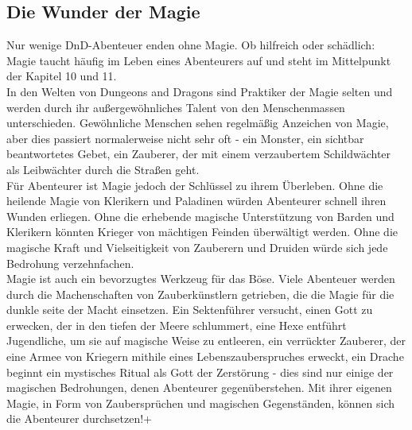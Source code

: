 \subsection{Die Wunder der Magie}
Nur wenige DnD-Abenteuer enden ohne Magie. Ob hilfreich oder schädlich: Magie taucht häufig im Leben eines Abenteurers auf und steht im Mittelpunkt der Kapitel 10 und 11.\\
In den Welten von Dungeons and Dragons sind Praktiker der Magie selten und werden durch ihr außergewöhnliches Talent von den Menschenmassen unterschieden. Gewöhnliche Menschen sehen regelmäßig Anzeichen von Magie, aber dies passiert normalerweise nicht sehr oft - ein Monster, ein sichtbar beantwortetes Gebet, ein Zauberer, der mit einem verzaubertem Schildwächter als Leibwächter durch die Straßen geht.\\
Für Abenteurer ist Magie jedoch der Schlüssel zu ihrem Überleben. Ohne die heilende Magie von Klerikern und Paladinen würden Abenteurer schnell ihren Wunden erliegen. Ohne die erhebende magische Unterstützung von Barden und Klerikern könnten Krieger von mächtigen Feinden überwältigt werden. Ohne die magische Kraft und Vielseitigkeit von Zauberern und Druiden würde sich jede Bedrohung verzehnfachen.\\
Magie ist auch ein bevorzugtes Werkzeug für das Böse. Viele Abenteuer werden durch die Machenschaften von Zauberkünstlern getrieben, die die Magie für die dunkle seite der Macht einsetzen. Ein Sektenführer versucht, einen Gott zu erwecken, der in den tiefen der Meere schlummert, eine Hexe entführt Jugendliche, um sie auf magische Weise zu entleeren, ein verrückter Zauberer, der eine Armee von Kriegern mithile eines Lebenszauberspruches erweckt, ein Drache beginnt ein mystisches Ritual als Gott der Zerstörung - dies sind nur einige der magischen Bedrohungen, denen Abenteurer gegenüberstehen. Mit ihrer eigenen Magie, in Form von Zaubersprüchen und magischen Gegenständen, können sich die Abenteurer durchsetzen!+
